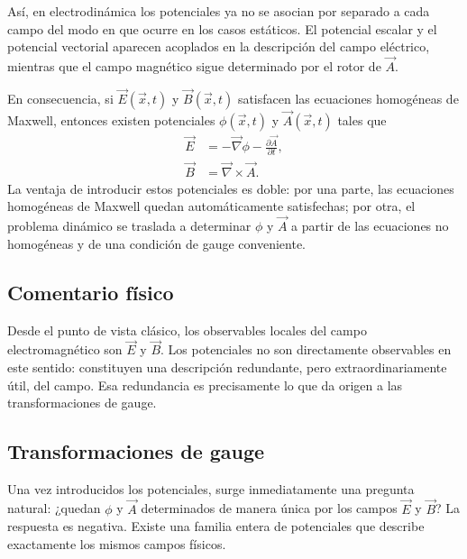 \documentclass[12pt,a4paper]{article}
\theoremstyle{definition}
\theoremstyle{plain}
\numberwithin{equation}{section}
\theoremstyle{remark}
\newcommand{\E}{\vec{E}}
\newcommand{\B}{\vec{B}}
\begin{document}
Así, en electrodinámica los potenciales ya no se asocian por separado a cada campo del modo en que ocurre en los casos estáticos. El potencial escalar y el potencial vectorial aparecen acoplados en la descripción del campo eléctrico, mientras que el campo magnético sigue determinado por el rotor de $\vec A$.

En consecuencia, si $\E(\vec x,t)$ y $\B(\vec x,t)$ satisfacen las ecuaciones homogéneas de Maxwell, entonces existen potenciales $\phi(\vec x,t)$ y $\vec A(\vec x,t)$ tales que
\begin{align}
    \E &= -\vec\nabla \phi - \frac{\partial \vec A}{\partial t}, \label{3.campo-electrico-en-potenciales}\\
    \B &= \vec\nabla\times\vec A.\label{3.campo-magnetico-en-potenciales}
\end{align}
La ventaja de introducir estos potenciales es doble: por una parte, las ecuaciones homogéneas de Maxwell quedan automáticamente satisfechas; por otra, el problema dinámico se traslada a determinar $\phi$ y $\vec A$ a partir de las ecuaciones no homogéneas y de una condición de gauge conveniente.

\subsection*{Comentario físico}
Desde el punto de vista clásico, los observables locales del campo electromagnético son $\E$ y $\B$. Los potenciales no son directamente observables en este sentido: constituyen una descripción redundante, pero extraordinariamente útil, del campo. Esa redundancia es precisamente lo que da origen a las transformaciones de gauge.

\subsection*{Transformaciones de gauge}

Una vez introducidos los potenciales, surge inmediatamente una pregunta natural: ¿quedan $\phi$ y $\vec A$ determinados de manera única por los campos $\E$ y $\B$? La respuesta es negativa. Existe una familia entera de potenciales que describe exactamente los mismos campos físicos.
\end{document}
